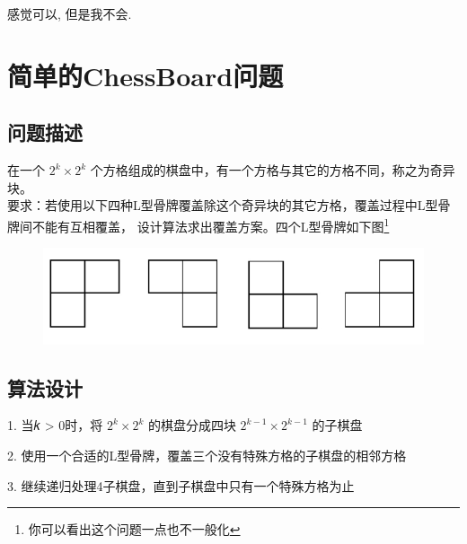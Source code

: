 \documentclass[a4paper, 10pt]{ctexart} %
\begin{document}
感觉可以, 但是我不会.
\newpage
\section{简单的ChessBoard问题}
\subsection{问题描述}
在一个 $2 ^{k} \times 2 ^{k}$ 个方格组成的棋盘中，有一个方格与其它的方格不同，称之为奇异块。\\
要求：若使用以下四种L型骨牌覆盖除这个奇异块的其它方格，覆盖过程中L型骨牌间不能有互相覆盖，
设计算法求出覆盖方案。四个L型骨牌如下图\footnote{你可以看出这个问题一点也不一般化}\\
\begin{figure}[H]
    \centering
    \includegraphics[scale = 0.3]{6.png}\caption{}
\end{figure}
\subsection{算法设计} 
1. 当𝑘 > 0时，将 $2 ^{k} \times 2^{k} $ 的棋盘分成四块 $2^{ k-1} \times 2^{k-1}$ 的子棋盘

2. 使用一个合适的L型骨牌，覆盖三个没有特殊方格的子棋盘的相邻方格

3. 继续递归处理4子棋盘，直到子棋盘中只有一个特殊方格为止
\end{document}
